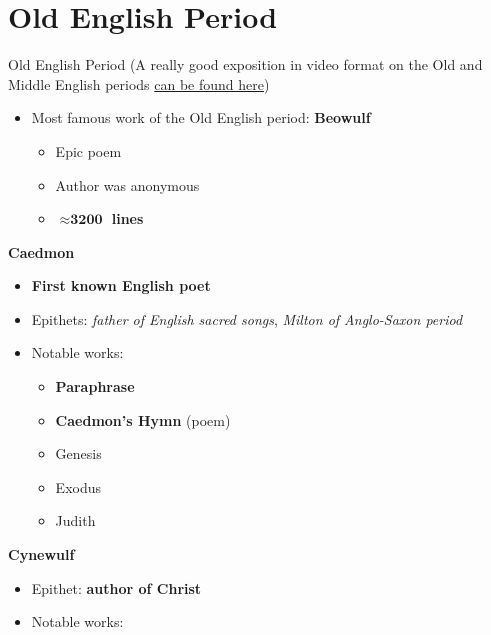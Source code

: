 \documentclass[
  12pt,
    progressbar=frametitle]{beamer}
\providecommand{\tightlist}{%
  \setlength{\itemsep}{0pt}\setlength{\parskip}{0pt}}
\begin{document}
\section{Old English Period}
\begin{frame}[allowframebreaks]
{Old English Period}
\scriptsize(A really good exposition in video format on the Old and
Middle English periods
\href{https://youtu.be/sYLopdePO2A}{can be found here}) \normalsize

\begin{itemize}
\tightlist
\item
  Most famous work of the Old English period: \textbf{Beowulf}

  \begin{itemize}
  \tightlist
  \item
    Epic poem
  \item
    Author was anonymous
  \item
    \textbf{\(\boldsymbol\approx \textbf{3200}\) lines}
  \end{itemize}
\end{itemize}

\large\textbf{Caedmon}\normalsize\vspace{-3mm}

\begin{itemize}
\tightlist
\item
  \textbf{First known English poet}
\item
  Epithets: \emph{father of English sacred songs}, \emph{Milton of
  Anglo-Saxon period}
\item
  Notable works:

  \begin{itemize}
  \tightlist
  \item
    \textbf{Paraphrase}
  \item
    \textbf{Caedmon's Hymn} (poem)
  \item
    Genesis
  \item
    Exodus
  \item
    Judith
  \end{itemize}
\end{itemize}

\large\textbf{Cynewulf}\normalsize\vspace{-3mm}

\begin{itemize}
\tightlist
\item
  Epithet: \textbf{author of Christ}
\item
  Notable works:


\end{itemize}
\end{frame}
\end{document}
